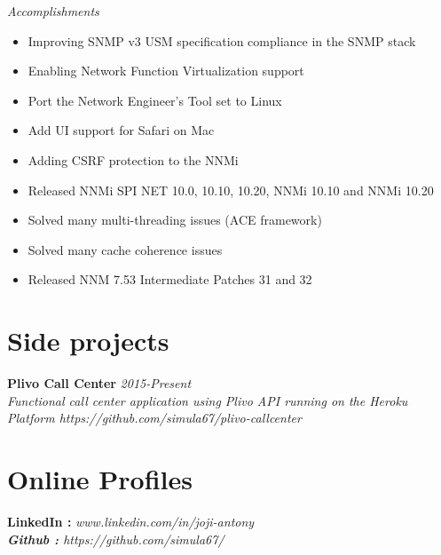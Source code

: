 \documentclass[line,margin]{res}
\begin{document}
\begin{resume}
{\it{Accomplishments}}\\
\begin{itemize}
\item Improving SNMP v3 USM specification compliance in the SNMP stack
\item Enabling Network Function Virtualization support
\item Port the Network Engineer's Tool set to Linux
\item Add UI support for Safari on Mac
\item Adding CSRF protection to the NNMi
\item Released NNMi SPI NET 10.0, 10.10, 10.20, NNMi 10.10 and NNMi 10.20
\item Solved many multi-threading issues (ACE framework)
\item Solved many cache coherence issues
\item Released NNM 7.53 Intermediate Patches 31 and 32
\end{itemize}


\section{Side projects}
{\bf Plivo Call Center} \hfill \it{2015-Present}\\
Functional call center application using Plivo API running on the Heroku Platform
https://github.com/simula67/plivo-callcenter\\

\section{Online Profiles}
{\bf LinkedIn :} \it{www.linkedin.com/in/joji-antony} \\
{\bf Github :} \it{https://github.com/simula67/} \\

\end{resume}
\end{document}
